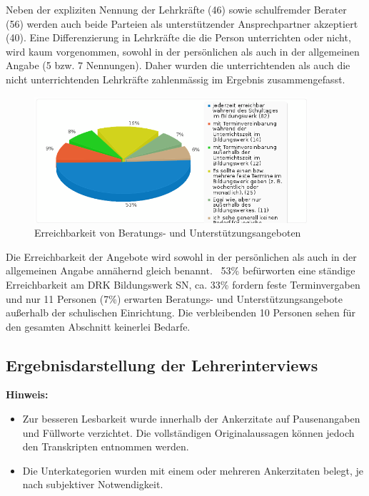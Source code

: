 Neben der expliziten Nennung der Lehrkräfte (46) sowie schulfremder Berater (56) werden auch beide Parteien als unterstützender Ansprechpartner akzeptiert (40). Eine Differenzierung in Lehrkräfte die die Person unterrichten oder nicht, wird kaum vorgenommen, sowohl in der persönlichen als auch in der allgemeinen Angabe (5 bzw. 7 Nennungen). Daher wurden die unterrichtenden als auch die nicht unterrichtenden Lehrkräfte zahlenmässig im Ergebnis zusammengefasst.

\begin{figure}
	\centering
		\includegraphics[width=0.9\textwidth]{images/Erreichbarkeit-von-Beratungs-und-Unterstuetzungangeboten(2).png}
	\caption{Erreichbarkeit von Beratungs- und Unterstützungsangeboten}
	\label{fig:Erreichbarkeit-von-Beratungs-und-Unterstuetzungangeboten(2)}
\end{figure}

Die Erreichbarkeit der Angebote wird sowohl in der persönlichen als auch in der allgemeinen Angabe annähernd gleich benannt. ~53\% befürworten eine ständige Erreichbarkeit am DRK Bildungswerk SN, ca. 33\% fordern feste Terminvergaben und nur 11 Personen (7\%) erwarten Beratungs- und Unterstützungsangebote außerhalb der schulischen Einrichtung. Die verbleibenden 10 Personen sehen für den gesamten Abschnitt keinerlei Bedarfe.

\newpage
\subsection{Ergebnisdarstellung der Lehrerinterviews}
\label{sec:ErgebnisdarstellungDerLehrerinterviews}

\textbf{Hinweis:} 
\begin{itemize}
	\item Zur besseren Lesbarkeit wurde innerhalb der Ankerzitate auf Pausenangaben und Füllworte verzichtet. Die vollständigen Originalaussagen können jedoch den Transkripten entnommen werden.
	\item Die Unterkategorien wurden mit einem oder mehreren Ankerzitaten belegt, je nach subjektiver Notwendigkeit.
\end{itemize}


